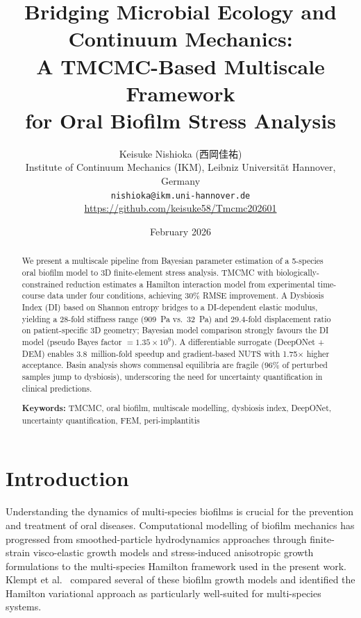 \documentclass[11pt,a4paper]{article}
\title{Bridging Microbial Ecology and Continuum Mechanics:\\A TMCMC-Based Multiscale Framework\\for Oral Biofilm Stress Analysis}
\author{Keisuke Nishioka (西岡佳祐)\\[4pt]
\small Institute of Continuum Mechanics (IKM), Leibniz Universit\"at Hannover, Germany\\[2pt]
\small \texttt{nishioka@ikm.uni-hannover.de}\\[2pt]
\small \url{https://github.com/keisuke58/Tmcmc202601}}
\date{February 2026}
\begin{document}
\maketitle

\begin{abstract}
We present a multiscale pipeline from Bayesian parameter estimation of a 5-species oral biofilm model to 3D finite-element stress analysis. TMCMC with biologically-constrained reduction estimates a Hamilton interaction model from experimental time-course data under four conditions, achieving 30\% RMSE improvement. A Dysbiosis Index (DI) based on Shannon entropy bridges to a DI-dependent elastic modulus, yielding a 28-fold stiffness range (909~Pa vs.\ 32~Pa) and 29.4-fold displacement ratio on patient-specific 3D geometry; Bayesian model comparison strongly favours the DI model (pseudo Bayes factor $= 1.35 \times 10^9$). A differentiable surrogate (DeepONet + DEM) enables 3.8~million-fold speedup and gradient-based NUTS with 1.75$\times$ higher acceptance. Basin analysis shows commensal equilibria are fragile (96\% of perturbed samples jump to dysbiosis), underscoring the need for uncertainty quantification in clinical predictions.

\vspace{0.5cm}
\noindent\textbf{Keywords:} TMCMC, oral biofilm, multiscale modelling, dysbiosis index, DeepONet, uncertainty quantification, FEM, peri-implantitis
\end{abstract}

\tableofcontents
\newpage

\section{Introduction}

Understanding the dynamics of multi-species biofilms is crucial for the prevention and treatment of oral diseases. Computational modelling of biofilm mechanics has progressed from smoothed-particle hydrodynamics approaches \cite{Soleimani2016SPHBiofilm} through finite-strain visco-elastic growth models \cite{Soleimani2019ViscoElasticGrowth} and stress-induced anisotropic growth formulations \cite{Soleimani2020AnisotropicGrowth} to the multi-species Hamilton framework used in the present work. Klempt et al.~\cite{Klempt2023PAMMBiofilm} compared several of these biofilm growth models and identified the Hamilton variational approach as particularly well-suited for multi-species systems.
\end{document}
